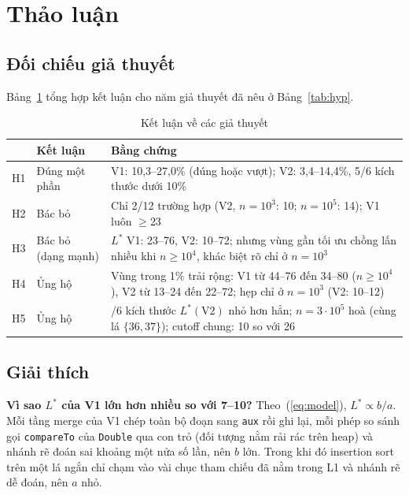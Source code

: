 \documentclass[11pt,a4paper]{article}
\begin{document}
\section{Thảo luận}\label{sec:discussion}

\subsection{Đối chiếu giả thuyết}
Bảng~\ref{tab:verdict} tổng hợp kết luận cho năm giả thuyết đã nêu ở Bảng~\ref{tab:hyp}.

\begin{table}[!htbp]
\centering
\begin{tabular}{>{\raggedright}p{}>{\raggedright}p{}>{\raggedright\arraybackslash}p{}}
\toprule
& Kết luận & Bằng chứng \\
\midrule
H1 & Đúng một phần & V1: 10,3--27,0\% (đúng hoặc vượt); V2: 3,4--14,4\%, 5/6 kích thước dưới 10\% \\
H2 & Bác bỏ & Chỉ 2/12 trường hợp (V2, $n=10^3$: 10; $n=10^5$: 14); V1 luôn $\ge 23$ \\
H3 & Bác bỏ (dạng mạnh) & $L^*$ V1: 23--76, V2: 10--72; nhưng vùng gần tối ưu chồng lấn nhiều khi $n \ge 10^4$, khác biệt rõ chỉ ở $n=10^3$ \\
H4 & Ủng hộ & Vùng trong 1\% trải rộng: V1 từ 44--76 đến 34--80 ($n \ge 10^4$), V2 từ 13--24 đến 22--72; hẹp chỉ ở $n=10^3$ (V2: 10--12) \\
H5 & Ủng hộ & 5/6 kích thước $L^*(\mathrm{V2})$ nhỏ hơn hẳn; $n=3\cdot10^5$ hoà (cùng lá $\{36,37\}$); cutoff chung: 10 so với 26 \\
\bottomrule
\end{tabular}
\caption{Kết luận về các giả thuyết}
\label{tab:verdict}
\end{table}

\subsection{Giải thích}\label{sec:explain}
\textbf{Vì sao $L^*$ của V1 lớn hơn nhiều so với 7--10?} Theo~(\ref{eq:model}), $L^* \propto b/a$. Mỗi tầng merge của V1
chép toàn bộ đoạn sang \texttt{aux} rồi ghi lại, mỗi phép so sánh gọi \texttt{compareTo} của \texttt{Double} qua con trỏ
(đối tượng nằm rải rác trên heap) và nhánh rẽ đoán sai khoảng một nửa số lần, nên $b$ lớn. Trong khi đó insertion sort
trên một lá ngắn chỉ chạm vào vài chục tham chiếu đã nằm trong L1 và nhánh rẽ dễ đoán, nên $a$ nhỏ.
\end{document}

